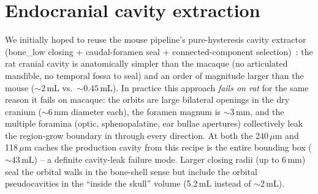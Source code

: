 \documentclass{compactarticle}
\begin{document}
\section{Endocranial cavity extraction}
\label{sec:cavity}

We initially hoped to reuse the mouse pipeline's pure-hysteresis
cavity extractor (bone\_low closing + caudal-foramen seal +
connected-component selection)~\cite{tuba-mouse}: the rat cranial
cavity is anatomically simpler than the macaque (no articulated
mandible, no temporal fossa to seal) and an order of magnitude
larger than the mouse (${\sim}2$\,mL vs.\ ${\sim}0.45$\,mL). In
practice this approach \emph{fails on rat} for the same reason it
fails on macaque: the orbits are large bilateral openings in the dry
cranium (${\sim}6$\,mm diameter each), the foramen magnum is
${\sim}3$\,mm, and the multiple foramina (optic, sphenopalatine, ear
bullae apertures) collectively leak the region-grow boundary in
through every direction. At both the 240\,$\mu$m and 118\,$\mu$m
caches the production cavity from this recipe is the entire
bounding box ($\sim$43\,mL) -- a definite cavity-leak failure mode.
Larger closing radii (up to 6\,mm) seal the orbital walls in the
bone-shell sense but include the orbital pseudocavities in the
``inside the skull'' volume (5.2\,mL instead of $\sim$2\,mL).
\end{document}
